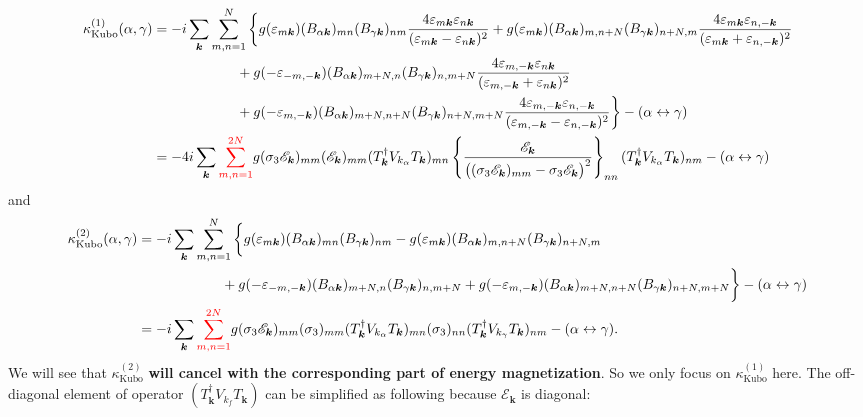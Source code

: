 \documentclass[10pt,nofootinbib]{revtex4}
\begin{document}
		\begin{align}
			\kappa_{\text{Kubo}}^{(1)}(\alpha,\gamma)&=-i\sum_{\bm{k}}\sum_{m,n=1}^N\bigg\{g(\varepsilon_{m\bm{k}})(B_{\alpha\bm{k}})_{mn}(B_{\gamma\bm{k}})_{nm}\dfrac{4 \varepsilon_{m\bm{k}}\varepsilon_{n\bm{k}}}{(\varepsilon_{m\bm{k}}-\varepsilon_{n\bm{k}})^2}+g(\varepsilon_{m\bm{k}})(B_{\alpha\bm{k}})_{m,n+N}(B_{\gamma\bm{k}})_{n+N,m}\dfrac{4 \varepsilon_{m\bm{k}}\varepsilon_{n,-\bm{k}}}{(\varepsilon_{m\bm{k}}+\varepsilon_{n,-\bm{k}})^2}\nonumber\\
			&\qquad\qquad\qquad+g(-\varepsilon_{-m,-\bm{k}})(B_{\alpha\bm{k}})_{m+N,n}(B_{\gamma\bm{k}})_{n,m+N}\dfrac{4 \varepsilon_{m,-\bm{k}}\varepsilon_{n\bm{k}}}{(\varepsilon_{m,-\bm{k}}+\varepsilon_{n\bm{k}})^2}\nonumber\\
			&\qquad\qquad\qquad+g(-\varepsilon_{m,-\bm{k}})(B_{\alpha\bm{k}})_{m+N,n+N}(B_{\gamma\bm{k}})_{n+N,m+N}\dfrac{4 \varepsilon_{m,-\bm{k}}\varepsilon_{n,-\bm{k}}}{(\varepsilon_{m,-\bm{k}}-\varepsilon_{n,-\bm{k}})^2}\bigg\}-(\alpha\leftrightarrow\gamma)\nonumber\\
			&=-4i\sum_{\bm{k}}{\color{red}\sum_{m,n=1}^{2N}} g(\sigma_3\mathscr{E}_{\bm{k}})_{mm}(\mathscr{E}_{\bm{k}})_{mm}(T^\dagger_{\bm{k}}V_{k_\alpha}T_{\bm{k}})_{mn}\left\{\dfrac{\mathscr{E}_{\bm{k}}}{\big((\sigma_3\mathscr{E}_{\bm{k}})_{mm}-\sigma_3\mathscr{E}_{\bm{k}}\big)^2}\right\}_{nn}(T^\dagger_{\bm{k}}V_{k_\alpha}T_{\bm{k}})_{nm}-(\alpha\leftrightarrow\gamma)\label{1.4.6}
		\end{align}
		and
		\begin{align}
			\kappa_{\text{Kubo}}^{(2)}(\alpha,\gamma)&=-i\sum_{\bm{k}}\sum_{m,n=1}^N\bigg\{g(\varepsilon_{m\bm{k}})(B_{\alpha\bm{k}})_{mn}(B_{\gamma\bm{k}})_{nm}-g(\varepsilon_{m\bm{k}})(B_{\alpha\bm{k}})_{m,n+N}(B_{\gamma\bm{k}})_{n+N,m}\nonumber\\
			&\qquad\qquad\qquad+g(-\varepsilon_{-m,-\bm{k}})(B_{\alpha\bm{k}})_{m+N,n}(B_{\gamma\bm{k}})_{n,m+N}+g(-\varepsilon_{m,-\bm{k}})(B_{\alpha\bm{k}})_{m+N,n+N}(B_{\gamma\bm{k}})_{n+N,m+N}\bigg\}-(\alpha\leftrightarrow\gamma)\nonumber\\
			&=-i\sum_{\bm{k}}{\color{red}\sum_{m,n=1}^{2N}}g(\sigma_3\mathscr{E}_{\bm{k}})_{mm}(\sigma_3)_{mm}(T^\dagger_{\bm{k}}V_{k_\alpha}T_{\bm{k}})_{mn}(\sigma_3)_{nn}(T^\dagger_{\bm{k}}V_{k_\gamma}T_{\bm{k}})_{nm}-(\alpha\leftrightarrow\gamma).\label{1.4.7}
		\end{align}
		\indent We will see that $\kappa_{\text{Kubo}}^{(2)}$ \textbf{will cancel with the corresponding part of energy magnetization}. So we only focus on $\kappa_{\text{Kubo}}^{(1)}$ here. The off-diagonal element of operator $(T_{\bm{k}}^\dagger V_{k_f}T_{\bm{k}})$ can be simplified as following because $\mathscr{E}_{\bm{k}}$ is diagonal:
\end{document}
